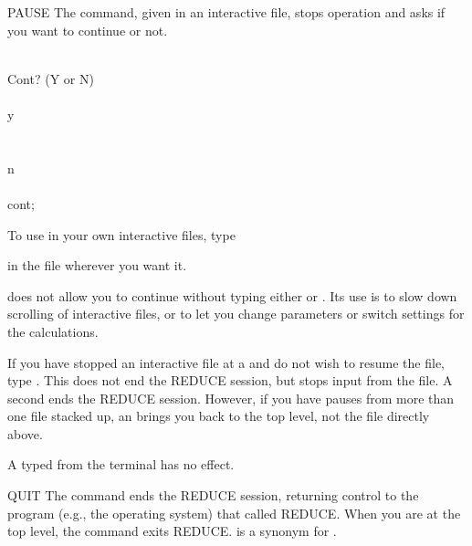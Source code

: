 \begin{Command}[pause]{PAUSE}
The  command, given in an interactive file, stops operation and
asks if you want to continue or not.

\begin{Examples}
 \\
				   Cont? (Y or N) \\
 \\
y\\
 \\
 \\
n \\
 \\
cont; \\
\end{Examples}

To use  in your own interactive files, type



in the file wherever you want it.


\begin{Comments}
 does not allow you to continue without typing either 
or .  Its use is to slow down scrolling of interactive files, or to
let you change parameters or switch settings for the calculations.

If you have stopped an interactive file at a  and do not wish to
resume the file, type .  This does not end the REDUCE session, but
stops input from the file.  A second  ends the REDUCE session.
However, if you have pauses from more than one file stacked up, an 
brings you back to the top level, not the file directly above.

A  typed from the terminal has no effect.
\end{Comments}
\end{Command}


\begin{Command}[quit]{QUIT}
The  command ends the REDUCE session, returning control to the
program (e.g., the operating system) that called REDUCE.  When you are at
the top level, the  command exits REDUCE.  is a
synonym for .

\end{Command}


